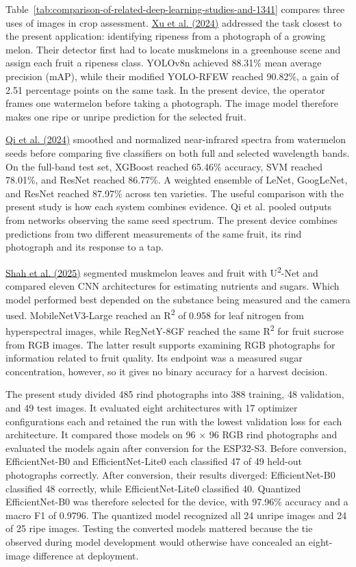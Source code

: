 \begin{thesisprose}
Table~\ref{tab:comparison-of-related-deep-learning-studies-and-1341} compares three uses of images in crop assessment. \hyperlink{cite.xu2024}{Xu et al. (2024)} addressed the task closest to the present application: identifying ripeness from a photograph of a growing melon. Their detector first had to locate muskmelons in a greenhouse scene and assign each fruit a ripeness class. YOLOv8n achieved 88.31\% mean average precision (mAP), while their modified YOLO-RFEW reached 90.82\%, a gain of 2.51 percentage points on the same task. In the present device, the operator frames one watermelon before taking a photograph. The image model therefore makes one ripe or unripe prediction for the selected fruit.

\hyperlink{cite.qi2024}{Qi et al. (2024)} smoothed and normalized near-infrared spectra from watermelon seeds before comparing five classifiers on both full and selected wavelength bands. On the full-band test set, XGBoost reached 65.46\% accuracy, SVM reached 78.01\%, and ResNet reached 86.77\%. A weighted ensemble of LeNet, GoogLeNet, and ResNet reached 87.97\% across ten varieties. The useful comparison with the present study is how each system combines evidence. Qi et al. pooled outputs from networks observing the same seed spectrum. The present device combines predictions from two different measurements of the same fruit, its rind photograph and its response to a tap.

\hyperlink{cite.shah2025}{Shah et al. (2025)} segmented muskmelon leaves and fruit with U\textsuperscript{2}-Net and compared eleven CNN architectures for estimating nutrients and sugars. Which model performed best depended on the substance being measured and the camera used. MobileNetV3-Large reached an R\textsuperscript{2} of 0.958 for leaf nitrogen from hyperspectral images, while RegNetY-8GF reached the same R\textsuperscript{2} for fruit sucrose from RGB images. The latter result supports examining RGB photographs for information related to fruit quality. Its endpoint was a measured sugar concentration, however, so it gives no binary accuracy for a harvest decision.

The present study divided 485 rind photographs into 388 training, 48 validation, and 49 test images. It evaluated eight architectures with 17 optimizer configurations each and retained the run with the lowest validation loss for each architecture. It compared those models on 96 \ensuremath{\times} 96 RGB rind photographs and evaluated the models again after conversion for the ESP32-S3. Before conversion, EfficientNet-B0 and EfficientNet-Lite0 each classified 47 of 49 held-out photographs correctly. After conversion, their results diverged: EfficientNet-B0 classified 48 correctly, while EfficientNet-Lite0 classified 40. Quantized EfficientNet-B0 was therefore selected for the device, with 97.96\% accuracy and a macro F1 of 0.9796. The quantized model recognized all 24 unripe images and 24 of 25 ripe images. Testing the converted models mattered because the tie observed during model development would otherwise have concealed an eight-image difference at deployment.


\end{thesisprose}
